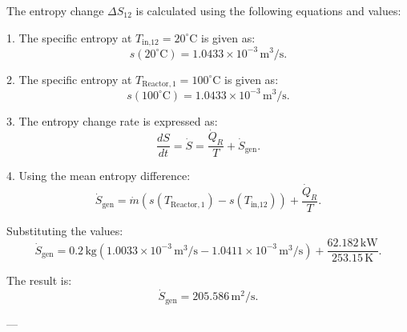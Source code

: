 The entropy change \( \Delta S_{12} \) is calculated using the following equations and values:

1. The specific entropy at \( T_{\text{in,12}} = 20^\circ\text{C} \) is given as:  
\[
s(20^\circ\text{C}) = 1.0433 \times 10^{-3} \, \text{m}^3/\text{s}.
\]

2. The specific entropy at \( T_{\text{Reactor},1} = 100^\circ\text{C} \) is given as:  
\[
s(100^\circ\text{C}) = 1.0433 \times 10^{-3} \, \text{m}^3/\text{s}.
\]

3. The entropy change rate is expressed as:  
\[
\frac{dS}{dt} = \dot{S} = \frac{\dot{Q}_R}{T} + \dot{S}_{\text{gen}}.
\]

4. Using the mean entropy difference:  
\[
\dot{S}_{\text{gen}} = \dot{m} \left( s(T_{\text{Reactor},1}) - s(T_{\text{in,12}}) \right) + \frac{\dot{Q}_R}{T}.
\]

Substituting the values:  
\[
\dot{S}_{\text{gen}} = 0.2 \, \text{kg} \left( 1.0033 \times 10^{-3} \, \text{m}^3/\text{s} - 1.0411 \times 10^{-3} \, \text{m}^3/\text{s} \right) + \frac{62.182 \, \text{kW}}{253.15 \, \text{K}}.
\]

The result is:  
\[
\dot{S}_{\text{gen}} = 205.586 \, \text{m}^2/\text{s}.
\]

---